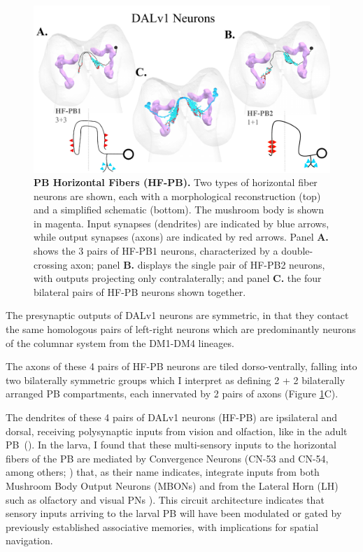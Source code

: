     \begin{figure}
        \centering
        \includegraphics[width=12cm]{Figs/CX/DALV1s.pdf}
        \caption[PB Dalv1 Neurons]{\textbf{PB Horizontal Fibers (HF-PB).} Two types of horizontal fiber neurons are shown, each with a morphological reconstruction (top) and a simplified schematic (bottom). The mushroom body is shown in magenta. Input synapses (dendrites) are indicated by blue arrows, while output synapses (axons) are indicated by red arrows. Panel \textbf{A.} shows the 3 pairs of HF-PB1 neurons, characterized by a double-crossing axon; panel \textbf{B.} displays the single pair of HF-PB2 neurons, with outputs projecting only contralaterally; and panel \textbf{C.} the four bilateral pairs of HF-PB neurons shown together.}
        \label{DALv1s}
    \end{figure}


    The presynaptic outputs of DALv1 neurons are symmetric, in that they contact the same homologous pairs of left-right neurons which are predominantly neurons of the columnar system from the DM1-DM4 lineages.

    The axons of these 4 pairs of HF-PB neurons are tiled dorso-ventrally, falling into two bilaterally symmetric groups which I interpret as defining 2 + 2 bilaterally arranged PB compartments, each innervated by 2 pairs of axons (Figure \ref{DALv1s}C). 

    The dendrites of these 4 pairs of DALv1 neurons (HF-PB) are ipsilateral and dorsal, receiving polysynaptic inputs from vision and olfaction, like in the adult PB~(\citep{hulse2021connectome}). In the larva, I found that these multi-sensory inputs to the horizontal fibers of the PB are mediated by Convergence Neurons (CN-53 and CN-54, among others; \citep{eschbach2021circuits}) that, as their name indicates, integrate inputs from both Mushroom Body Output Neurons (MBONs) and from the Lateral Horn (LH) such as olfactory and visual PNs \citep{eschbach2020recurrent}). This circuit architecture indicates that sensory inputs arriving to the larval PB will have been modulated or gated by previously established associative memories, with implications for spatial navigation.

